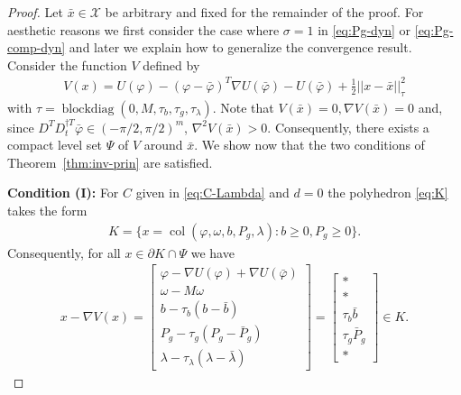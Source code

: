 \documentclass[journal]{IEEEtran}
\newcommand{\w}{\omega}
\newcommand{\1}{\mathds 1}
\newcommand{\p}{\partial}
\newcommand{\vp}{\varphi}
\newcommand{\n}{\nabla}
\renewcommand{\l}{\lambda}
\DeclareMathOperator{\col}{col}
\DeclareMathOperator{\blockdiag}{blockdiag}
\theoremstyle{remark}
\theoremstyle{definition}
\begin{document}
\begin{proof}
  Let $\bar x\in \mathcal X$ be arbitrary and fixed for the remainder
  of the proof. For aesthetic reasons we first consider the case where $\sigma=1$ in \eqref{eq:Pg-dyn} or \eqref{eq:Pg-comp-dyn} and later we explain how to generalize the convergence result. Consider the function $V$ defined by
  \begin{align}\label{eq:V}
    V(x)=U(\vp)-(\vp-\bar \vp)^T\n U(\bar \vp)-U(\bar
    \vp)+\frac12||x-\bar x||^2_{\tau}
  \end{align}
  with $\tau=\blockdiag(0,M,\tau_b,\tau_g,\tau_\l)$.  Note that
  $V(\bar x)=0,\n V(\bar x)=0$ and, since $D^TD_t^{\dagger
    T}\bar\vp\in(-\pi/2,\pi/2)^{m}$, $\n^2V(\bar x)>0$. Consequently,
  there exists a compact level set $\Psi$ of $V$ around $\bar x$. We
  show now that the two conditions of Theorem~\ref{thm:inv-prin} are
  satisfied.
  
  \textbf{Condition (I):} For $C$ given in \eqref{eq:C-Lambda} and
  $d=0$ the polyhedron \eqref{eq:K} takes the form
  \begin{align*}
    K=\{x=\col(\vp,\w,b,P_g,\l) : b\geq0, P_g\geq0\}.
  \end{align*}
  Consequently, for all $x\in\p K\cap \Psi$ we have
  \begin{align*}
    x-\nabla V(x)=
    \begin{bmatrix}
      \vp-\nabla U(\vp)+\n U(\bar \vp)\\
      \w-M\w\\
      b-\tau_b(b-\bar b)\\
      P_g-\tau_g(P_g-\bar P_g)\\
      \l-\tau_\l(\l-\bar \l)
    \end{bmatrix}=
    \begin{bmatrix}
      *\\
      *\\
      \tau_b\bar b\\
      \tau_g\bar P_g\\
      *
    \end{bmatrix}\in K.
  \end{align*}


\end{proof}
\end{document}
